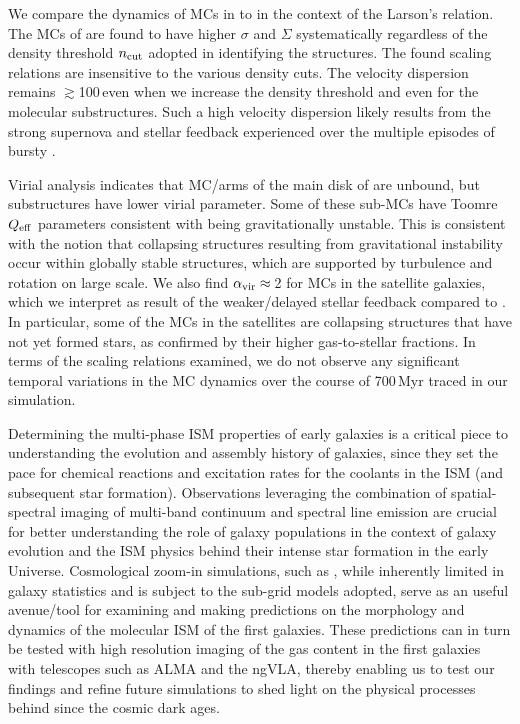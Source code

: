 \IfFileExists{emulateapjlegacy.cls}{\documentclass[iop]{emulateapjlegacy}}{\documentclass[iop]{emulateapj}}
\begin{document}
We compare the dynamics of MCs in \flower to \obs in the context of the Larson's relation.
The MCs of \flower are found to have higher $\sigma$ and $\Sigma$ systematically regardless of the
density threshold $n_{\rm cut}$ adopted in identifying the structures.
 The found scaling relations are insensitive to the various density cuts. 
 The velocity dispersion remains $\gtrsim$100\,\kms even when we increase the density threshold and 
 even for the molecular substructures. 
 Such a high velocity dispersion likely results from the strong supernova and stellar feedback \flower experienced 
 over the multiple episodes of bursty \SF.

Virial analysis indicates that MC/arms of the main disk of \flower are unbound, but substructures have
lower virial parameter. Some of these sub-MCs have Toomre $Q_{\rm eff}$ parameters consistent with being
gravitationally unstable. This is consistent with the notion that collapsing structures resulting from
gravitational instability occur within globally stable structures, which are
supported by turbulence and rotation on large scale.
We also find $\alpha_{\rm vir}\approx$\,2 for MCs in the satellite galaxies, which we interpret as
result of the weaker/delayed stellar feedback compared to \flower. 
In particular, some of the MCs in the satellites are collapsing structures that have not yet formed stars, as confirmed by their
higher gas-to-stellar fractions.
In terms of the scaling relations examined, we do not observe any significant
temporal variations in the MC dynamics over the course of 700\,Myr traced in our simulation.

Determining the multi-phase ISM properties of early galaxies
is a critical piece to understanding the evolution and
assembly history of galaxies, since they set the pace
for chemical reactions and excitation rates for the coolants in the ISM (and subsequent star formation).
Observations leveraging the combination of spatial-spectral imaging of
multi-band continuum and spectral line emission are crucial for better understanding
the role of \highz galaxy populations
in the context of galaxy evolution and the ISM physics behind their intense star formation in the early Universe.
Cosmological zoom-in simulations, such as , while inherently limited in galaxy
statistics and is subject to the sub-grid models adopted,
serve as an useful avenue/tool for examining and making predictions on the morphology and dynamics of
the molecular ISM of the first galaxies.
These predictions can in turn be
tested with high resolution imaging of the gas content in the first galaxies with telescopes such as ALMA and the ngVLA, thereby
enabling us to test our findings and refine future simulations to shed light on the physical processes behind
\SF since the cosmic dark ages.
\end{document}
